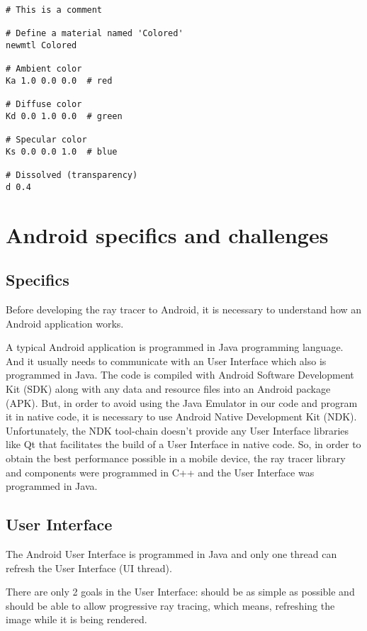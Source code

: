 \begin{lstlisting}[caption={.MTL file format}, captionpos=b, label=mtl]
# This is a comment

# Define a material named 'Colored'
newmtl Colored

# Ambient color
Ka 1.0 0.0 0.0	# red

# Diffuse color
Kd 0.0 1.0 0.0	# green

# Specular color
Ks 0.0 0.0 1.0	# blue

# Dissolved (transparency)
d 0.4
\end{lstlisting}

\section{Android specifics and challenges}

\subsection{Specifics}

\par
Before developing the ray tracer to Android, it is necessary to understand how an Android application works.

\par
A typical Android application is programmed in Java programming language.
And it usually needs to communicate with an User Interface which also is programmed in Java.
The code is compiled with Android Software Development Kit (SDK) along with any data and resource files into an Android package (APK).
But, in order to avoid using the Java Emulator in our code and program it in native code, it is necessary to use Android Native Development Kit (NDK).
Unfortunately, the NDK tool-chain doesn't provide any User Interface libraries like Qt that facilitates the build of a User Interface in native code.
So, in order to obtain the best performance possible in a mobile device, the ray tracer library and components were programmed in C++ and the User Interface was programmed in Java.

\subsection{User Interface}

\par
The Android User Interface is programmed in Java and only one thread can refresh the User Interface (UI thread).

\par
There are only 2 goals in the User Interface: should be as simple as possible and should be able to allow progressive ray tracing, which means, refreshing the image while it is being rendered.

